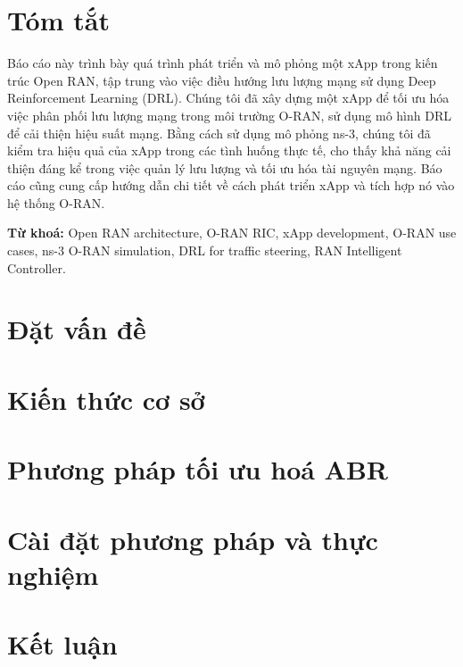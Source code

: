 \documentclass[12pt]{report}
\begin{document}
\chapter*{Tóm tắt}
Báo cáo này trình bày quá trình phát triển và mô phỏng một xApp trong kiến trúc Open RAN, tập trung vào việc điều hướng lưu lượng mạng sử dụng Deep Reinforcement Learning (DRL). Chúng tôi đã xây dựng một xApp để tối ưu hóa việc phân phối lưu lượng mạng trong môi trường O-RAN, sử dụng mô hình DRL để cải thiện hiệu suất mạng. Bằng cách sử dụng mô phỏng ns-3, chúng tôi đã kiểm tra hiệu quả của xApp trong các tình huống thực tế, cho thấy khả năng cải thiện đáng kể trong việc quản lý lưu lượng và tối ưu hóa tài nguyên mạng. Báo cáo cũng cung cấp hướng dẫn chi tiết về cách phát triển xApp và tích hợp nó vào hệ thống O-RAN.

\textbf{Từ khoá:} Open RAN architecture, O-RAN RIC, xApp development, O-RAN use cases, ns-3 O-RAN simulation, DRL for traffic steering, RAN Intelligent Controller.

\tableofcontents





\chapter{Đặt vấn đề}
% 

\chapter{Kiến thức cơ sở}




\chapter{Phương pháp tối ưu hoá ABR}
% 

\chapter{Cài đặt phương pháp và thực nghiệm}
% 

\chapter{Kết luận}
% 

% 

\printbibliography[heading=bibintoc]
\end{document}
